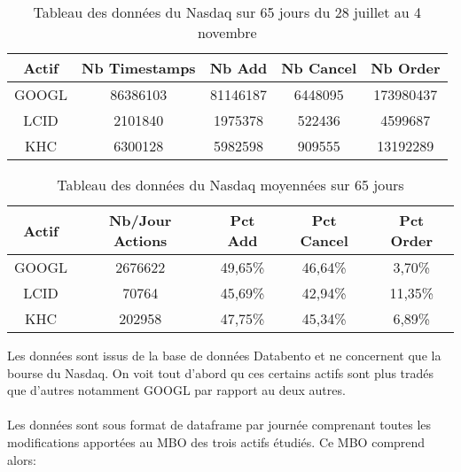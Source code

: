 \documentclass[12pt,a4paper]{article}
\theoremstyle{definition}
\theoremstyle{remark}
\begin{document}
\begin{table}[h!]
\centering
\begin{tabular}{|c|c|c|c|c|}
\hline
\textbf{Actif}& \textbf{Nb Timestamps} & \textbf{Nb Add} & \textbf{Nb Cancel} & \textbf{Nb Order}\\ \hline
GOOGL  & 86386103         & 81146187        & 6448095    & 173980437  \\ 
\hline
LCID       & 2101840         & 1975378         & 522436  & 4599687  \\
\hline
KHC   & 6300128   & 5982598 & 909555 & 13192289                   
\\ \hline
\end{tabular}
\caption{Tableau des données du Nasdaq sur 65 jours du 28 juillet au 4 novembre}
\label{tab:exemple}
\end{table}
\begin{table}[h!]
\centering
\begin{tabular}{|c|c|c|c|c|}
\hline
\textbf{Actif}& \textbf{Nb/Jour Actions}& \textbf{Pct Add} & \textbf{Pct Cancel} & \textbf{Pct Order}\\ \hline
GOOGL & 2676622 & 49,65\%  & 46,64\%     & 3,70\%    \\ 
\hline
LCID  & 70764   & 45,69\%  & 42,94\%    &11,35\%    \\
\hline
KHC  & 202958   & 47,75\%  & 45,34\%  & 6,89\%                     
\\ \hline
\end{tabular}
\caption{Tableau des données du Nasdaq moyennées sur 65 jours}
\label{tab:exemple}
\end{table}
Les données sont issus de la base de données Databento et ne concernent que la bourse du Nasdaq. On voit tout d'abord qu ces certains actifs sont plus tradés que d'autres notamment GOOGL par rapport au deux autres.
\\
\\
Les données sont sous format de dataframe par journée comprenant toutes les modifications apportées au MBO des trois actifs étudiés. Ce MBO comprend alors:
\end{document}
